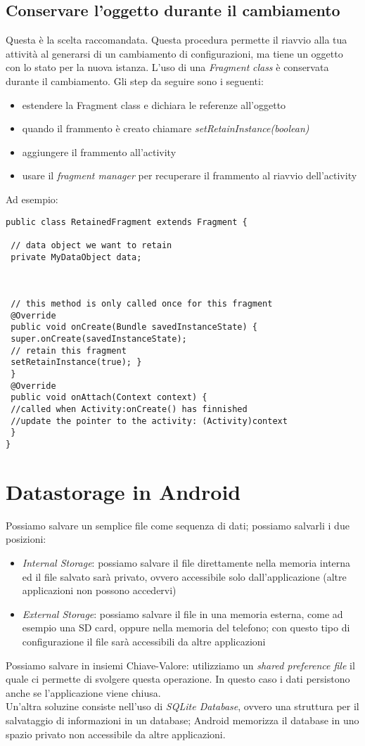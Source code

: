 \subsection{Conservare l'oggetto durante il cambiamento}
Questa è la scelta raccomandata. Questa procedura permette il riavvio alla tua
attività al generarsi di un cambiamento di configurazioni, ma tiene un oggetto
con lo stato per la nuova istanza. L'uso di una \textit{Fragment} \textit{class}
è conservata durante il cambiamento. Gli step da seguire sono i seguenti:
\begin{itemize}
    \item estendere la Fragment class e dichiara le referenze all'oggetto
    \item quando il frammento è creato chiamare
\textit{setRetainInstance(boolean)}
    \item aggiungere il frammento all'activity
    \item usare il \textit{fragment manager} per recuperare il frammento al
riavvio dell'activity
\end{itemize}
Ad esempio:
\begin{lstlisting}[frame=single]
public class RetainedFragment extends Fragment {

 // data object we want to retain
 private MyDataObject data;



 // this method is only called once for this fragment
 @Override
 public void onCreate(Bundle savedInstanceState) {
 super.onCreate(savedInstanceState);
 // retain this fragment
 setRetainInstance(true); }
 }
 @Override
 public void onAttach(Context context) {
 //called when Activity:onCreate() has finnished
 //update the pointer to the activity: (Activity)context
 }
}
\end{lstlisting}
\section{Datastorage in Android}
Possiamo salvare un semplice file come sequenza di dati; possiamo salvarli i due
posizioni:
\begin{itemize}
    \item \textit{Internal Storage}: possiamo salvare il file direttamente nella
memoria interna ed il file salvato sarà privato, ovvero accessibile solo
dall'applicazione (altre applicazioni non possono accedervi)
    \item \textit{External Storage}: possiamo salvare il file in una memoria
esterna, come ad esempio una SD card, oppure nella memoria del telefono; con
questo tipo di configurazione il file sarà accessibili da altre applicazioni
\end{itemize}
Possiamo salvare in insiemi Chiave-Valore: utilizziamo un \textit{shared
preference file} il quale ci permette di svolgere questa operazione. In questo
caso i dati persistono anche se l'applicazione viene chiusa. \\
Un'altra soluzine consiste nell'uso di \textit{SQLite Database}, ovvero una
struttura per il salvataggio di informazioni in un database; Android memorizza
il database in uno spazio privato non accessibile da altre applicazioni.
